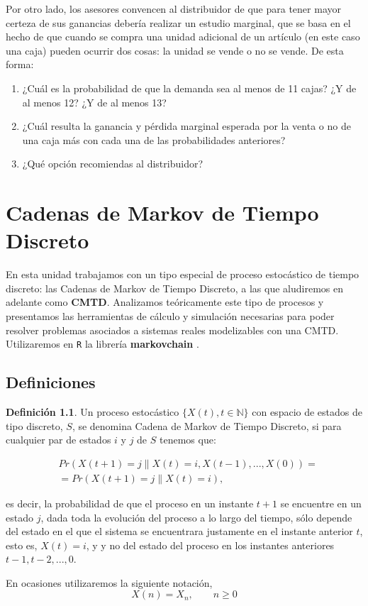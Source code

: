 \documentclass[
]{book}
\providecommand{\tightlist}{%
  \setlength{\itemsep}{0pt}\setlength{\parskip}{0pt}}
\theoremstyle{definition}
\newtheorem{definition}{Definición}[chapter]
\theoremstyle{definition}
\theoremstyle{definition}
\theoremstyle{definition}
\theoremstyle{remark}
\begin{document}
Por otro lado, los asesores convencen al distribuidor de que para tener mayor certeza de sus ganancias debería realizar un estudio marginal, que se basa en el hecho de que cuando se compra una unidad adicional de un artículo (en este caso una caja) pueden ocurrir dos cosas: la unidad se vende o no se vende. De esta forma:

\begin{enumerate}
\def\labelenumi{\arabic{enumi}.}
\tightlist
\item
  ¿Cuál es la probabilidad de que la demanda sea al menos de 11 cajas? ¿Y de al menos 12? ¿Y de al menos 13?
\item
  ¿Cuál resulta la ganancia y pérdida marginal esperada por la venta o no de una caja más con cada una de las probabilidades anteriores?
\item
  ¿Qué opción recomiendas al distribuidor?
\end{enumerate}

\hypertarget{cmtd}{%
\chapter{Cadenas de Markov de Tiempo Discreto}\label{cmtd}}

En esta unidad trabajamos con un tipo especial de proceso estocástico de tiempo discreto: las Cadenas de Markov de Tiempo Discreto, a las que aludiremos en adelante como \textbf{CMTD}. Analizamos teóricamente este tipo de procesos y presentamos las herramientas de cálculo y simulación necesarias para poder resolver problemas asociados a sistemas reales modelizables con una CMTD. Utilizaremos en \texttt{R} la librería \textbf{markovchain} \citep{R-markovchain}.

\hypertarget{definiciones}{%
\section{Definiciones}\label{definiciones}}

\begin{definition}
\protect\hypertarget{def:CMTC}{}\label{def:CMTC}Un proceso estocástico \(\{X(t), t \in \mathbb{N}\}\) con espacio de estados de tipo discreto, \(S\), se denomina Cadena de Markov de Tiempo Discreto, si para cualquier par de estados \(i\) y \(j\) de \(S\) tenemos que:

\begin{eqnarray}
&Pr(X(t+1) = j \| X(t) = i, X(t-1),...,X(0)) = \\
&= Pr(X(t+1) = j \| X(t) = i),
\label{eq:cmtd}
\end{eqnarray}

es decir, la probabilidad de que el proceso en un instante \(t+1\) se encuentre en un estado \(j\), dada toda la evolución del proceso a lo largo del tiempo, sólo depende del estado en el que el sistema se encuentrara justamente en el instante anterior \(t\), esto es, \(X(t)=i\), y y no del estado del proceso en los instantes anteriores \(t-1, t-2,...,0\).

En ocasiones utilizaremos la siguiente notación, \[X(n)=X_n, \qquad n \geq 0\]
\end{definition}
\end{document}
